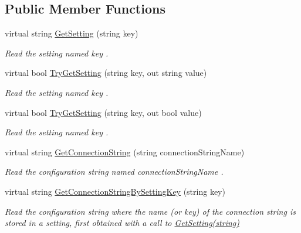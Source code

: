 \subsection*{Public Member Functions}
\begin{DoxyCompactItemize}
\item 
virtual string \hyperlink{classCqrs_1_1Configuration_1_1ConfigurationManager_ac3e31af665b95b781fee23f577170a63_ac3e31af665b95b781fee23f577170a63}{Get\+Setting} (string key)
\begin{DoxyCompactList}\small\item\em Read the setting named {\itshape key} . \end{DoxyCompactList}\item 
virtual bool \hyperlink{classCqrs_1_1Configuration_1_1ConfigurationManager_ad87af2a011af065d6d3e0d2ff01c7f6e_ad87af2a011af065d6d3e0d2ff01c7f6e}{Try\+Get\+Setting} (string key, out string value)
\begin{DoxyCompactList}\small\item\em Read the setting named {\itshape key} . \end{DoxyCompactList}\item 
virtual bool \hyperlink{classCqrs_1_1Configuration_1_1ConfigurationManager_a40810d0b9fd2f3d1c4a270681e908c84_a40810d0b9fd2f3d1c4a270681e908c84}{Try\+Get\+Setting} (string key, out bool value)
\begin{DoxyCompactList}\small\item\em Read the setting named {\itshape key} . \end{DoxyCompactList}\item 
virtual string \hyperlink{classCqrs_1_1Configuration_1_1ConfigurationManager_a8be43b873c281c370ecda3f39a235c4b_a8be43b873c281c370ecda3f39a235c4b}{Get\+Connection\+String} (string connection\+String\+Name)
\begin{DoxyCompactList}\small\item\em Read the configuration string named {\itshape connection\+String\+Name} . \end{DoxyCompactList}\item 
virtual string \hyperlink{classCqrs_1_1Configuration_1_1ConfigurationManager_accd6e8fbb5566f00d356c7fa6c6fdb98_accd6e8fbb5566f00d356c7fa6c6fdb98}{Get\+Connection\+String\+By\+Setting\+Key} (string key)
\begin{DoxyCompactList}\small\item\em Read the configuration string where the name (or key) of the connection string is stored in a setting, first obtained with a call to \hyperlink{classCqrs_1_1Configuration_1_1ConfigurationManager_ac3e31af665b95b781fee23f577170a63_ac3e31af665b95b781fee23f577170a63}{Get\+Setting(string)} \end{DoxyCompactList}\end{DoxyCompactItemize}


